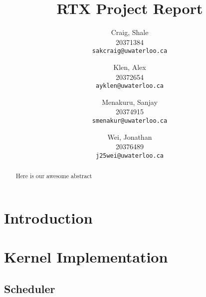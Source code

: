\documentclass[12pt]{report}
\begin{document}

\title{RTX Project Report}

\author{
    Craig, Shale\\
    20371384\\
    \texttt{sakcraig@uwaterloo.ca}
    \and
    Klen, Alex\\
    20372654\\
    \texttt{ayklen@uwaterloo.ca}
    \and
    Menakuru, Sanjay\\
    20374915\\
    \texttt{smenakur@uwaterloo.ca}
    \and
    Wei, Jonathan\\
    20376489\\
    \texttt{j25wei@uwaterloo.ca}
}

\maketitle

\begin{abstract}
    Here is our awesome abstract
\end{abstract}

\tableofcontents
\listofalgorithms
\listoffigures



\part{Introduction}

\part{Kernel Implementation}

\chapter{Scheduler}
\end{document}

